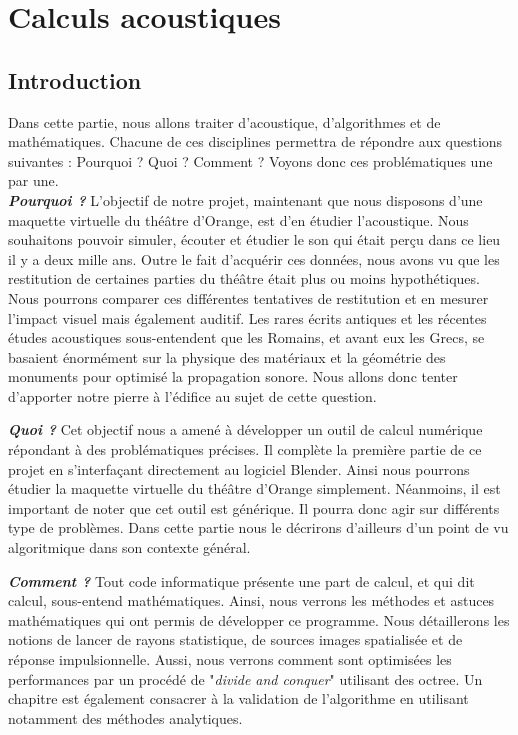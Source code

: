 \part{Calculs acoustiques}
	\chapter*{Introduction}
Dans cette partie, nous allons traiter d'acoustique, d'algorithmes et de mathématiques. Chacune de ces disciplines permettra de répondre aux questions suivantes : Pourquoi ? Quoi ? Comment ? Voyons donc ces problématiques une par une.\\

\textit{\textbf{Pourquoi ?}} L'objectif de notre projet, maintenant que nous disposons d'une maquette virtuelle du théâtre d'Orange, est d'en étudier l'acoustique. Nous souhaitons pouvoir simuler, écouter et étudier le son qui était perçu dans ce lieu il y a deux mille ans. Outre le fait d'acquérir ces données, nous avons vu que les restitution de certaines parties du théâtre était plus ou moins hypothétiques. Nous pourrons comparer ces différentes tentatives de restitution et en mesurer l'impact visuel mais également auditif. Les rares écrits antiques et les récentes études acoustiques sous-entendent que les Romains, et avant eux les Grecs, se basaient énormément sur la physique des matériaux et la géométrie des monuments pour optimisé la propagation sonore. Nous allons donc tenter d'apporter notre pierre à l'édifice au sujet de cette question.

\textit{\textbf{Quoi ?}} Cet objectif nous a amené à développer un outil de calcul numérique répondant à des problématiques précises. Il complète la première partie de ce projet en s'interfaçant directement au logiciel Blender. Ainsi nous pourrons étudier la maquette virtuelle du théâtre d'Orange simplement. Néanmoins, il est important de noter que cet outil est générique. Il pourra donc agir sur différents type de problèmes. Dans cette partie nous le décrirons d'ailleurs d'un point de vu algoritmique dans son contexte général.

\textit{\textbf{Comment ?}} Tout code informatique présente une part de calcul, et qui dit calcul, sous-entend mathématiques. Ainsi, nous verrons les méthodes et astuces mathématiques qui ont permis de développer ce programme. Nous détaillerons les notions de lancer de rayons statistique, de sources images spatialisée et de réponse impulsionnelle. Aussi, nous verrons comment sont optimisées les performances par un procédé de "\textit{divide and conquer}" utilisant des octree. Un chapitre est également consacrer à la validation de l'algorithme en utilisant notamment des méthodes analytiques.\\

